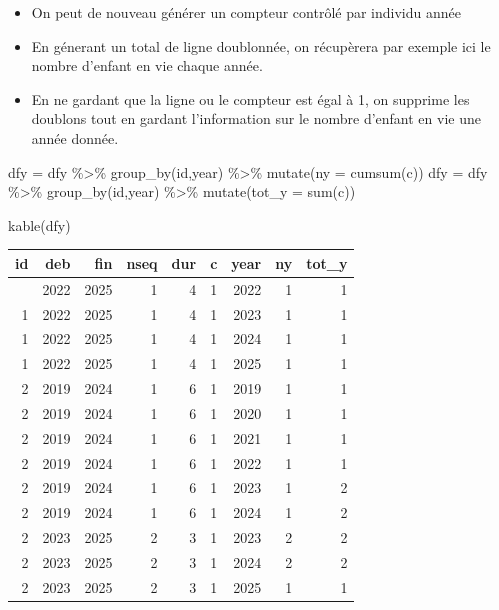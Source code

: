 \documentclass[
  12pt,
  letterpaper,
  DIV=11,
  numbers=noendperiod,
  onepage,
  openany]{scrreprt}
\newenvironment{Shaded}{\begin{snugshade}}{\end{snugshade}}
\newcommand{\AttributeTok}[1]{\textcolor[rgb]{0.80,0.80,0.80}{#1}}
\newcommand{\FunctionTok}[1]{\textcolor[rgb]{0.94,0.94,0.56}{#1}}
\newcommand{\NormalTok}[1]{\textcolor[rgb]{0.80,0.80,0.80}{#1}}
\newcommand{\OtherTok}[1]{\textcolor[rgb]{0.94,0.94,0.56}{#1}}
\newcommand{\SpecialCharTok}[1]{\textcolor[rgb]{0.86,0.64,0.64}{#1}}
\providecommand{\tightlist}{%
  \setlength{\itemsep}{0pt}\setlength{\parskip}{0pt}}\usepackage{longtable,booktabs,array}
\begin{document}
\begin{itemize}
\tightlist
\item
  On peut de nouveau générer un compteur contrôlé par individu année
\item
  En génerant un total de ligne doublonnée, on récupèrera par exemple
  ici le nombre d'enfant en vie chaque année.
\item
  En ne gardant que la ligne ou le compteur est égal à 1, on supprime
  les doublons tout en gardant l'information sur le nombre d'enfant en
  vie une année donnée.
\end{itemize}

\begin{Shaded}
\begin{Highlighting}[]
\NormalTok{dfy }\OtherTok{=}\NormalTok{ dfy }\SpecialCharTok{\%\textgreater{}\%} \FunctionTok{group\_by}\NormalTok{(id,year) }\SpecialCharTok{\%\textgreater{}\%} \FunctionTok{mutate}\NormalTok{(}\AttributeTok{ny =} \FunctionTok{cumsum}\NormalTok{(c))}
\NormalTok{dfy }\OtherTok{=}\NormalTok{ dfy }\SpecialCharTok{\%\textgreater{}\%} \FunctionTok{group\_by}\NormalTok{(id,year) }\SpecialCharTok{\%\textgreater{}\%} \FunctionTok{mutate}\NormalTok{(}\AttributeTok{tot\_y =}  \FunctionTok{sum}\NormalTok{(c))}

\FunctionTok{kable}\NormalTok{(dfy)}
\end{Highlighting}
\end{Shaded}

\begin{longtable}[]{@{}rrrrrrrrr@{}}
\toprule\noalign{}
id & deb & fin & nseq & dur & c & year & ny & tot\_y \\
\midrule\noalign{}
\endhead
\bottomrule\noalign{}
\endlastfoot
1 & 2022 & 2025 & 1 & 4 & 1 & 2022 & 1 & 1 \\
1 & 2022 & 2025 & 1 & 4 & 1 & 2023 & 1 & 1 \\
1 & 2022 & 2025 & 1 & 4 & 1 & 2024 & 1 & 1 \\
1 & 2022 & 2025 & 1 & 4 & 1 & 2025 & 1 & 1 \\
2 & 2019 & 2024 & 1 & 6 & 1 & 2019 & 1 & 1 \\
2 & 2019 & 2024 & 1 & 6 & 1 & 2020 & 1 & 1 \\
2 & 2019 & 2024 & 1 & 6 & 1 & 2021 & 1 & 1 \\
2 & 2019 & 2024 & 1 & 6 & 1 & 2022 & 1 & 1 \\
2 & 2019 & 2024 & 1 & 6 & 1 & 2023 & 1 & 2 \\
2 & 2019 & 2024 & 1 & 6 & 1 & 2024 & 1 & 2 \\
2 & 2023 & 2025 & 2 & 3 & 1 & 2023 & 2 & 2 \\
2 & 2023 & 2025 & 2 & 3 & 1 & 2024 & 2 & 2 \\
2 & 2023 & 2025 & 2 & 3 & 1 & 2025 & 1 & 1 \\
\end{longtable}
\end{document}
